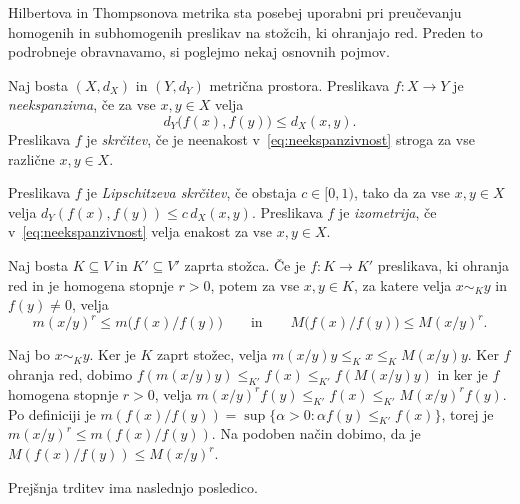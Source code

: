 \documentclass[mat2, tisk]{fmfdelo}
\begin{document}
Hilbertova in Thompsonova metrika sta posebej uporabni pri preučevanju
homogenih in subhomogenih preslikav na stožcih, ki ohranjajo red.
Preden to podrobneje obravnavamo, si poglejmo nekaj osnovnih pojmov.

\begin{definicija}
Naj bosta $(X,d_X)$ in $(Y,d_Y)$ metrična prostora. Preslikava
$f:X\longrightarrow Y$ je \emph{neekspanzivna}, če za vse $x,y\in X$
velja
\begin{equation}\label{eq:neekspanzivnost}
d_Y\bigl(f(x),f(y)\bigr)\leq d_X(x,y).
\end{equation}
Preslikava $f$ je \emph{skrčitev}, če je neenakost v~\eqref{eq:neekspanzivnost}
stroga za vse različne $x,y\in X$.

Preslikava $f$ je \emph{Lipschitzeva skrčitev}, če obstaja 
$c\in[0,1)$, tako da za vse $x,y\in X$ velja
$d_Y(f(x),f(y))\leq c\,d_X(x,y)$.
Preslikava $f$ je \emph{izometrija}, če v~\eqref{eq:neekspanzivnost} velja enakost
za vse $x,y\in X$.
\end{definicija}

\begin{trditev}
Naj bosta $K\subseteq V$ in $K'\subseteq V'$ zaprta stožca. Če je
$f:K\longrightarrow K'$ preslikava, ki ohranja red in je homogena
stopnje $r>0$, potem za vse $x,y\in K$, za katere velja $x\sim_K y$ in $f(y)\neq0$,
velja
\[
m(x/y)^r\leq m\bigl(f(x)/f(y)\bigr)
\qquad\text{in}\qquad
M\bigl(f(x)/f(y)\bigr)\leq M(x/y)^r.
\]
\end{trditev}

\begin{dokaz}
Naj bo $x\sim_K y$. Ker je $K$ zaprt stožec, velja
$m(x/y)y\leq_K x\leq_K M(x/y)y$. Ker $f$ ohranja red, dobimo 
$f(m(x/y) y)\leq_{K'}f(x)\leq_{K'} f(M(x/y) y)$ in ker je $f$ homogena stopnje $r>0$, velja
$m(x/y)^r f(y)\leq_{K'} f(x)\leq_{K'} M(x/y)^r f(y)$.
Po definiciji je $m (f(x)/f(y)) = \sup\{\alpha>0: \alpha f(y)\leq_{K'} f(x)\}$, torej je $m(x/y)^r\leq m(f(x)/f(y))$. Na podoben način 
dobimo, da je $M(f(x)/f(y))\leq M(x/y)^r$.
\end{dokaz}

Prejšnja trditev ima naslednjo posledico.
\end{document}
